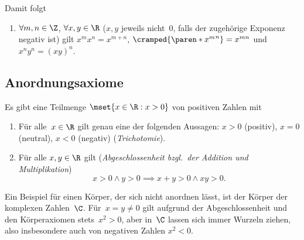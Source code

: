 \documentclass[a4paper]{article}
\begin{document}
Damit folgt
\begin{enumerate}[resume*=conclusions]
    \item $\forall m, n \in \Z$, $\forall x, y \in \R$ ($x, y$ jeweils nicht~0, falls der zugehörige Exponenz negativ ist) gilt $x^m x^n = x^{m+n}$, $\cramped{\paren*{x^m}^n} = x^{mn}$ und $x^n y^n = (xy)^n$.
\end{enumerate}

\subsection{Anordnungsaxiome}

\begin{axiom}[Anordnungsaxiome]
    Es gibt eine Teilmenge $\mset{x \in \R : x > 0}$ von positiven Zahlen mit
    \begin{enumerate}[resume*=axioms]
        \item Für alle~$x \in \R$ gilt genau eine der folgenden Aussagen: $x > 0$ (positiv), $x = 0$ (neutral), $x < 0$ (negativ) (\emph{Trichotomie}).
        \item Für alle $x, y \in \R$ gilt (\emph{Abgeschlossenheit bzgl.\ der Addition und Multiplikation})
              \begin{equation*}
                  x > 0 \wedge y > 0 \implies x + y > 0 \wedge x y > 0.
              \end{equation*}\label{ax:oc}
    \end{enumerate}
\end{axiom}

Ein Beispiel für einen Körper, der sich nicht anordnen lässt, ist der Körper der komplexen Zahlen~$\C$. Für~$x = y \neq 0$ gilt aufgrund der Abgeschlossenheit und den Körperaxiomen stets~$x^2 > 0$, aber in~$\C$ lassen sich immer Wurzeln ziehen, also insbesondere auch von negativen Zahlen $x^2 < 0$.
\end{document}

